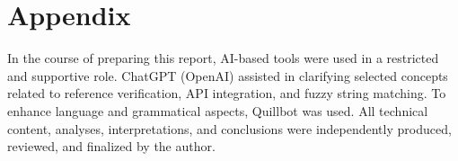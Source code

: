 \documentclass[12pt,a4paper,oneside]{report}
\begin{document}
\newpage
\chapter*{Appendix}

In the course of preparing this report, AI-based tools were used in a restricted and supportive role. ChatGPT (OpenAI) assisted in clarifying selected concepts related to reference verification, API integration, and fuzzy string matching. To enhance language and grammatical aspects, Quillbot was used. All technical content, analyses, interpretations, and conclusions were independently produced, reviewed, and finalized by the author.
\end{document}
